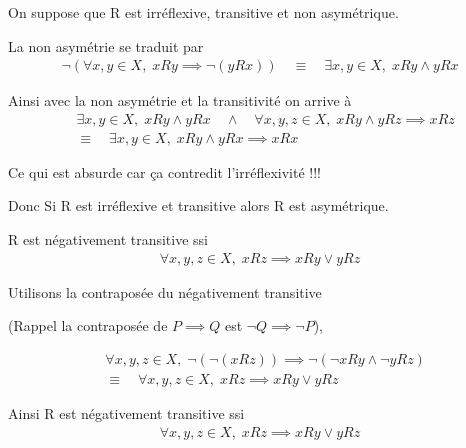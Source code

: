 \documentclass[a4paper, 12pt]{article}
\begin{document}
\begin{demonstration}
    On suppose que R est irréflexive, transitive et non asymétrique.

    \vspace{0.5em}

    La non asymétrie se traduit par
    \begin{align*}
        \neg(\forall x, y \in X, \; xRy \implies \neg(yRx)) \quad \equiv \quad \exists x, y \in X, \; xRy \land yRx 
    \end{align*}

    Ainsi avec la non asymétrie et la transitivité on arrive à
    \begin{align*}
        &\exists x, y \in X, \; xRy \land yRx \quad \land \quad \forall x, y, z \in X, \; xRy \land yRz \implies xRz \\
        &\equiv \quad \exists x, y \in X, \; xRy \land yRx \implies xRx
    \end{align*}

    Ce qui est absurde car ça contredit l'irréflexivité !!!

    \begin{rdem}
        Donc Si R est irréflexive et transitive alors R est asymétrique.
    \end{rdem}
\end{demonstration}

\begin{proposition}
    R est négativement transitive ssi
    \begin{align*}
        \forall x, y, z \in X, \; xRz \implies xRy \lor yRz
    \end{align*}
\end{proposition}

\begin{demonstration}
    Utilisons la contraposée du négativement transitive \par (Rappel la contraposée de $P \implies Q$ est $\neg Q \implies \neg P$),

    \begin{align*}
        &\forall x, y, z \in X, \; \neg(\neg(xRz)) \implies \neg(\neg xRy \land \neg yRz) \\
        &\equiv \quad \forall x, y, z \in X, \; xRz \implies xRy \lor yRz
    \end{align*}

    \begin{rdem}
        Ainsi R est négativement transitive ssi
        \begin{align*}
            \forall x, y, z \in X, \; xRz \implies xRy \lor yRz
        \end{align*}
    \end{rdem}
\end{demonstration}
\end{document}
